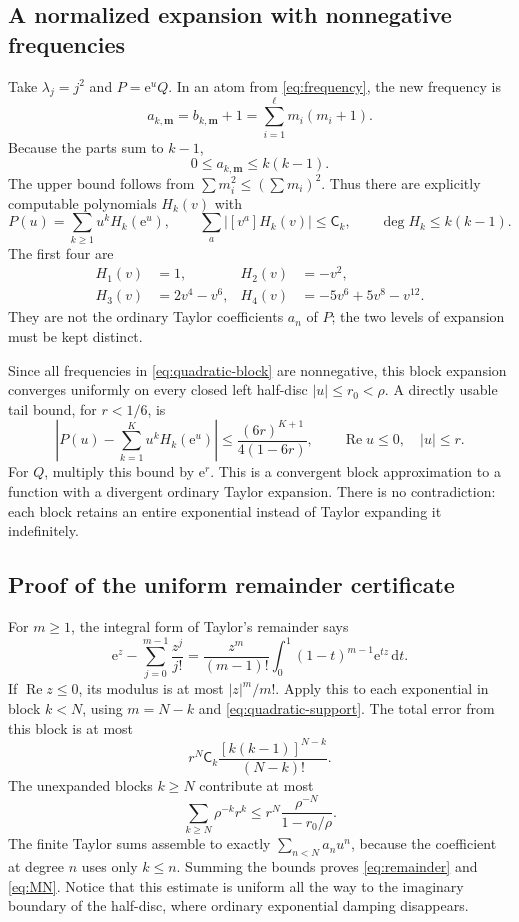 \documentclass[11pt,a4paper]{article}
\numberwithin{equation}{section}
\theoremstyle{definition}
\theoremstyle{remark}
\newcommand{\ee}{\mathrm e}
\newcommand{\dd}{\mathrm d}
\newcommand{\Ree}{\operatorname{Re}}
\newcommand{\sh}{\mathsf C}
\begin{document}
\subsection{A normalized expansion with nonnegative frequencies}
Take $\lambda_j=j^2$ and $P=\ee^uQ$.  In an atom from
\eqref{eq:frequency}, the new frequency is
\begin{equation}
 a_{k,\mathbf m}=b_{k,\mathbf m}+1
    =\sum_{i=1}^\ell m_i(m_i+1).
 \label{eq:quadratic-frequency}
\end{equation}
Because the parts sum to $k-1$,
\begin{equation}
 0\le a_{k,\mathbf m}\le k(k-1).
 \label{eq:quadratic-support}
\end{equation}
The upper bound follows from $\sum m_i^2\le(\sum m_i)^2$.
Thus there are explicitly computable polynomials $H_k(v)$ with
\begin{equation}
 P(u)=\sum_{k\ge1}u^kH_k(\ee^u),
 \qquad \sum_a|[v^a]H_k(v)|\le\sh_k,
 \qquad \deg H_k\le k(k-1).
 \label{eq:quadratic-block}
\end{equation}
The first four are
\begin{align*}
 H_1(v)&=1, & H_2(v)&=-v^2,\\
 H_3(v)&=2v^4-v^6, & H_4(v)&=-5v^6+5v^8-v^{12}.
\end{align*}
They are not the ordinary Taylor coefficients $a_n$ of $P$; the two
levels of expansion must be kept distinct.

Since all frequencies in \eqref{eq:quadratic-block} are nonnegative,
this block expansion converges uniformly on every closed left half-disc
$|u|\le r_0<\rho$.  A directly usable tail bound, for $r<1/6$, is
\begin{equation}
 \left|P(u)-\sum_{k=1}^K u^kH_k(\ee^u)\right|
 \le\frac{(6r)^{K+1}}{4(1-6r)},
 \qquad \Ree u\le0,\quad |u|\le r.
 \label{eq:geometric-tail}
\end{equation}
For $Q$, multiply this bound by $\ee^r$.
This is a convergent block approximation to a function with a divergent
ordinary Taylor expansion.  There is no contradiction: each block
retains an entire exponential instead of Taylor expanding it indefinitely.

\subsection{Proof of the uniform remainder certificate}
For $m\ge1$, the integral form of Taylor's remainder says
\[
 \ee^z-\sum_{j=0}^{m-1}\frac{z^j}{j!}
  =\frac{z^m}{(m-1)!}\int_0^1(1-t)^{m-1}\ee^{tz}\,\dd t.
\]
If $\Ree z\le0$, its modulus is at most $|z|^m/m!$.
Apply this to each exponential in block $k<N$, using $m=N-k$ and
\eqref{eq:quadratic-support}.  The total error from this block is at most
\[
 r^N\sh_k\frac{[k(k-1)]^{N-k}}{(N-k)!}.
\]
The unexpanded blocks $k\ge N$ contribute at most
\[
 \sum_{k\ge N}\rho^{-k}r^k
 \le r^N\frac{\rho^{-N}}{1-r_0/\rho}.
\]
The finite Taylor sums assemble to exactly
$\sum_{n<N}a_nu^n$, because the coefficient at degree $n$ uses only
$k\le n$.  Summing the bounds proves \eqref{eq:remainder} and
\eqref{eq:MN}.  Notice that this estimate is uniform all the way to
the imaginary boundary of the half-disc, where ordinary exponential
damping disappears.
\end{document}
